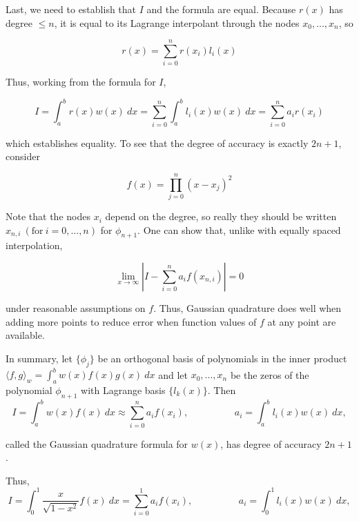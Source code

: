 \documentclass[a4paper,11pt]{report}
\begin{document}
\begin{enumerate}
\begin{itemize}
    Last, we need to establish that $I$ and the formula are equal. Because $r(x)$ has degree $\le n$, it is equal to its Lagrange interpolant through the nodes $x_{0},...,x_{n}$, so

    \begin{equation*}
    r(x) = \sum_{i=0}^{n} r(x_{i}) l_{i}(x)
    \end{equation*}

    Thus, working from the formula for $I$,
    
    \begin{equation*}
    I = \int_{a}^{b} r(x) w(x)\ dx = \sum_{i=0}^{n} \int_{a}^{b} l_{i}(x) w(x)\ dx = \sum_{i=0}^{n} a_{i} r(x_{i})
    \end{equation*}
    
    which establishes equality. To see that the degree of accuracy is exactly $2n+1$, consider
    
    \begin{equation*}
    f(x) = \prod_{j=0}^{n} (x-x_{j})^2
    \end{equation*}

    Note that the nodes $x_{i}$ depend on the degree, so really they should be written $x_{n,i}\ (\text{for}\ i = 0,...,n)$ for $\phi_{n+1}$. One can show that, unlike with equally spaced interpolation,
    
    \begin{equation*}
    \lim_{x\to\infty} |I - \sum_{i=0}^{n} a_{i} f(x_{n,i})| = 0
    \end{equation*}

    under reasonable assumptions on $f$. Thus, Gaussian quadrature does well when adding more points to reduce error when function values of $f$ at any point are available.

    In summary, let $\{\phi_{j}\}$ be an orthogonal basis of polynomials in the inner product $\langle f, g \rangle_{w} = \displaystyle \int_{a}^{b} w(x) f(x) g(x)\ dx$ and let $x_{0},...,x_{n}$ be the zeros of the polynomial $\phi_{n+1}$ with Lagrange basis $\{l_{k}(x)\}$. Then
    \begin{equation*}
    I = \int_{a}^{b} w(x) f(x)\ dx \approx \sum_{i=0}^{n} a_{i} f(x_{i}), \hspace{2cm} a_{i} = \int_{a}^{b} l_{i}(x) w(x)\ dx,
    \end{equation*}

    called the Gaussian quadrature formula for $w(x)$, has degree of accuracy $2n+1$.

    Thus,
    \begin{equation*}
    I = \int_{0}^{1} \frac{x}{\sqrt{1-x^2}} f(x)\ dx = \sum_{i=0}^{1} a_{i} f(x_{i}), \hspace{2cm} a_{i} = \int_{0}^{1} l_{i}(x) w(x)\ dx,
    \end{equation*}
    

\end{itemize}
\end{enumerate}
\end{document}
